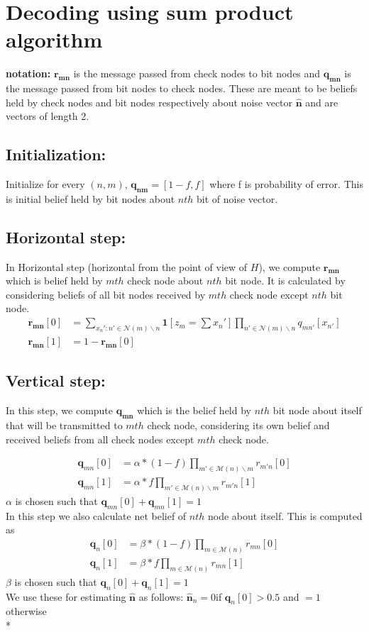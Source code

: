 \documentclass[a4paper]{article}
\begin{document}
\section{Decoding using sum product algorithm}
\textbf{notation: }$\mathbf{r_{mn}}$ is the message passed from check nodes to bit nodes and  $\mathbf{q_{mn}}$ is the message passed from bit nodes to check nodes. These are meant to be beliefs held by check nodes and bit nodes respectively about noise vector $\mathbf{\hat{n}}$ and are vectors of length 2.
\subsection* {Initialization: }
Initialize for every $(n,m)$, $\mathbf{q_{nm}} = [1-f, f] $ where f is probability of error. This is initial belief held by bit nodes about  $n th$ bit of noise vector.

\subsection*{Horizontal step: }
In Horizontal step (horizontal from the point of view of $H$), we compute $\mathbf{r_{mn}}$ which is belief held by $m th$ check node about $n th$ bit node. It is calculated by considering beliefs of all bit nodes received by  $m th$ check node except $n th$ bit node.
\begin{align*}
\mathbf{r_{mn}}[0]  &= \sum_{{x_n' : n' \in \mathcal{N}(m)\backslash n }} \mathbf{1}[z_m  =  \sum x_n'] \prod_{ n' \in \mathcal{N}(m)\backslash n} q_{mn'} [x_{n'}]  \\
\mathbf{r_{mn}}[1]  &=  1 - \mathbf{r_{mn}}[0]
\end{align*}
\subsection*{Vertical step: }
In this step, we compute  $\mathbf{q_{mn}}$ which is the belief held by $nth$ bit node about itself that will be transmitted to  $mth$ check node, considering its own belief and received beliefs from all check nodes except $mth$ check node.

\begin{align*}
\mathbf{q}_{mn}[0]  &=  \alpha *(1-f) \prod_{m' \in \mathcal{M}(n)\backslash m} r_{m'n}[0] \\
\mathbf{q}_{mn}[1]  &=  \alpha *f \prod_{m' \in \mathcal{M}(n)\backslash m} r_{m'n}[1]
\end{align*}
$\alpha$ is chosen such that $\mathbf{q}_{mn}[0] +  \mathbf{q}_{mn}[1]  = 1$
\\In this step we also calculate net belief of $nth$ node about itself. This is computed as 
\begin{align*}
\mathbf{q}_{n}[0]  &=  \beta *(1-f) \prod_{m \in \mathcal{M}(n)} r_{mn}[0] \\
\mathbf{q}_{n}[1]  &=  \beta *f \prod_{m \in \mathcal{M}(n)} r_{mn}[1]
\end{align*}
$\beta$ is chosen such that $\mathbf{q}_{n}[0] +  \mathbf{q}_{n}[1]  = 1$
\\We use these for estimating $\mathbf{\hat{n}}$ as follows:
$\mathbf{\hat{n}}_n = 0 $if $    \mathbf{q}_{n}[0] > 0.5$ and  $= 1$ otherwise
\\*
\end{document}
